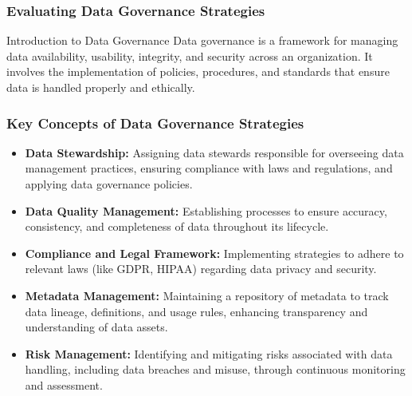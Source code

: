 \documentclass[aspectratio=169]{beamer}
\begin{document}
\begin{frame}[fragile]
    \frametitle{Evaluating Data Governance Strategies}
    \begin{block}{Introduction to Data Governance}
    Data governance is a framework for managing data availability, usability, integrity, and security across an organization. It involves the implementation of policies, procedures, and standards that ensure data is handled properly and ethically.
    \end{block}
\end{frame}

\begin{frame}[fragile]
    \frametitle{Key Concepts of Data Governance Strategies}
    \begin{itemize}
        \item \textbf{Data Stewardship:} Assigning data stewards responsible for overseeing data management practices, ensuring compliance with laws and regulations, and applying data governance policies.
        
        \item \textbf{Data Quality Management:} Establishing processes to ensure accuracy, consistency, and completeness of data throughout its lifecycle.
        
        \item \textbf{Compliance and Legal Framework:} Implementing strategies to adhere to relevant laws (like GDPR, HIPAA) regarding data privacy and security.
        
        \item \textbf{Metadata Management:} Maintaining a repository of metadata to track data lineage, definitions, and usage rules, enhancing transparency and understanding of data assets.
        
        \item \textbf{Risk Management:} Identifying and mitigating risks associated with data handling, including data breaches and misuse, through continuous monitoring and assessment.
    \end{itemize}
\end{frame}
\end{document}
